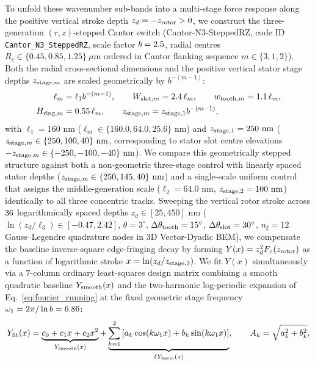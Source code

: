 \documentclass[pdflatex,sn-nature]{sn-jnl}
\DeclareRobustCommand{\roundzero}[1]{\fpeval{round(#1,0)}}
\DeclareRobustCommand{\roundtwo}[1]{\fpeval{round(#1,2)}}
\begin{document}
To unfold these wavenumber sub-bands into a multi-stage force response along the positive vertical stroke depth $z_d = -z_{\rm rotor} > 0$, we construct the three-generation $(r,z)$-stepped Cantor switch (Cantor-N3-SteppedRZ, code ID \texttt{Cantor\_N3\_SteppedRZ}, scale factor $b = 2.5{}$, radial centres $R_c \in \{0.45, 0.85, 1.25\}\ \mu\text{m}$ ordered in Cantor flanking sequence $m \in \{3, 1, 2\}$). Both the radial cross-sectional dimensions and the positive vertical stator stage depths $z_{{\rm stage},m}$ are scaled geometrically by $b^{-(m-1)}$:
\begin{equation}
\begin{aligned}
\ell_m &= \ell_1 b^{-(m-1)}, \qquad
W_{{\rm slot},m} = 2.4\,\ell_m, \qquad
w_{{\rm tooth},m} = 1.1\,\ell_m, \\
H_{{\rm ring},m} &= 0.55\,\ell_m, \qquad
z_{{\rm stage},m} = z_{{\rm stage},1} b^{-(m-1)},
\end{aligned}
\label{eq:methods_stepped_rz}
\end{equation}
with $\ell_1 = 160\text{ nm}$ ($\ell_m \in \{160.0, 64.0, 25.6\}\text{ nm}$) and $z_{{\rm stage},1} = 250\text{ nm}$ ($z_{{\rm stage},m} \in \{250, 100, 40\}\text{ nm}$, corresponding to stator slot centre elevations $-z_{{\rm stage},m} \in \{-250, -100, -40\}\text{ nm}$). We compare this geometrically stepped structure against both a non-geometric three-stage control with linearly spaced stator depths ($z_{{\rm stage},m} \in \{250, 145, 40\}\text{ nm}$) and a single-scale uniform control that assigns the middle-generation scale ($\ell_2 = 64.0\text{ nm}$, $z_{{\rm stage},2} = 100\text{ nm}$) identically to all three concentric tracks. Sweeping the vertical rotor stroke across $\roundzero{\LogperSteppedRzNZPts}$ logarithmically spaced depths $z_d \in [25, 450]\text{ nm}$ ($\ln(z_d/\ell_3) \in [-0.47, 2.42]$, $\theta = 3^\circ$, $\Delta\theta_{\rm tooth} = 15^\circ$, $\Delta\theta_{\rm slot} = 30^\circ$, $n_\xi = 12$ Gauss--Legendre quadrature nodes in 3D Vector-Dyadic BEM), we compensate the baseline inverse-square edge-fringing decay by forming $Y(x) = z_d^2 F_z(z_{\rm rotor})$ as a function of logarithmic stroke $x = \ln(z_d / z_{{\rm stage},3})$. We fit $Y(x)$ simultaneously via a $7$-column ordinary least-squares design matrix combining a smooth quadratic baseline $Y_{\rm smooth}(x)$ and the two-harmonic log-periodic expansion of Eq.~\eqref{eq:fourier_running} at the fixed geometric stage frequency $\omega_1 = 2\pi / \ln b = \roundtwo{\LogperSteppedRzOmegaone}$:
\begin{equation}
Y_{\rm fit}(x) = \underbrace{c_0 + c_1 x + c_2 x^2}_{Y_{\rm smooth}(x)} + \underbrace{\sum_{k=1}^{2} \left[ a_k \cos(k \omega_1 x) + b_k \sin(k \omega_1 x) \right]}_{\delta Y_{\rm harm}(x)}, \qquad A_k = \sqrt{a_k^2 + b_k^2},
\label{eq:methods_logper_fit}
\end{equation}
\end{document}

